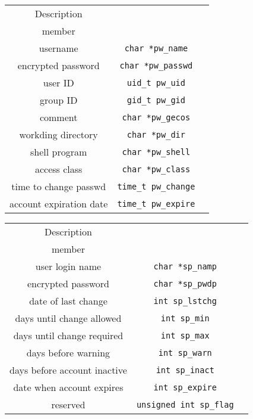 \documentclass[10pt]{article}
\begin{document}
\begin{multicols}{2}
\begin{minipage}{\columnwidth}
\begin{flushright}
\begin{tabular}{|c|c|c|}
                Description             & \makecell{\lstinline|struct passwd| \\member} \\
                \hline \hline
                username                & \lstinline|char *pw_name|           \\
                encrypted password      & \lstinline|char *pw_passwd|         \\
                user ID                 & \lstinline|uid_t pw_uid|            \\
                group ID                & \lstinline|gid_t pw_gid|            \\
                comment                 & \lstinline|char *pw_gecos|          \\
                workding directory      & \lstinline|char *pw_dir|            \\
                shell program           & \lstinline|char *pw_shell|          \\
                access class            & \lstinline|char *pw_class|          \\
                time to change passwd   & \lstinline|time_t pw_change|        \\
                account expiration date & \lstinline|time_t pw_expire|        \\
                \hline
            \end{tabular}
            \begin{tabular}{|c|c|c|}
                \hline
                Description                  & \makecell{\lstinline|struct spwd| \\member} \\
                \hline \hline
                user login name              & \lstinline|char *sp_namp|         \\
                encrypted password           & \lstinline|char *sp_pwdp|         \\
                date of last change          & \lstinline|int sp_lstchg|         \\
                days until change allowed    & \lstinline|int sp_min|            \\
                days until change required   & \lstinline|int sp_max|            \\
                days before warning          & \lstinline|int sp_warn|           \\
                days before account inactive & \lstinline|int sp_inact|          \\
                date when account expires    & \lstinline|int sp_expire|         \\
                reserved                     & \lstinline|unsigned int sp_flag|  \\
                \hline
            \end{tabular}

\end{flushright}
\end{minipage}
\end{multicols}
\end{document}
